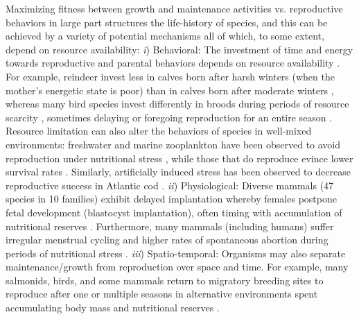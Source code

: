 \documentclass[12pt,english]{article}
\begin{document}
\begin{spacing}{1.9}
Maximizing fitness between growth and maintenance activities vs. reproductive behaviors in large part structures the life-history of species, and this can be achieved by a variety of potential mechanisms all of which, to some extent, depend on resource availability:
\emph{i}) Behavioral: The investment of time and energy towards reproductive and parental behaviors depends on resource availability \citep{Morris:1987eo}.
For example, reindeer invest less in calves born after harsh winters (when the mother's energetic state is poor) than in calves born after moderate winters \citep{Tveraa:2003fq}, whereas many bird species invest differently in broods during periods of resource scarcity \citep{Daan:1988va,Jacot:2009dv}, sometimes delaying or foregoing reproduction for an entire season \citep{Barboza:2002in}.
Resource limitation can also alter the behaviors of species in well-mixed environments: freshwater and marine zooplankton have been observed to avoid reproduction under nutritional stress \citep{Threlkeld:1976ih}, while those that do reproduce evince lower survival rates \citep{Kirk:1997cc}.
Similarly, artificially induced stress has been observed to decrease reproductive success in Atlantic cod \citep{Morgan:1999do}.
\emph{ii}) Physiological: Diverse mammals (47 species in 10 families) exhibit delayed implantation whereby females postpone fetal development (blastocyst implantation), often timing with accumulation of nutritional reserves \citep{Mead:1989dt,Sandell:1990kw}. %
Furthermore, many mammals (including humans) suffer irregular menstrual cycling and higher rates of spontaneous abortion during periods of nutritional stress \citep{Bulik:1999eo,Trites:2003cc}.
\emph{iii}) Spatio-temporal: Organisms may also separate maintenance/growth from reproduction over space and time. 
For example, many salmonids, birds, and some mammals return to migratory breeding sites to reproduce after one or multiple seasons in alternative environments spent accumulating body mass and nutritional reserves \citep{Weber:1998jg,Mduma:1999cp,Moore:2014hi}.

\end{spacing}
\end{document}

